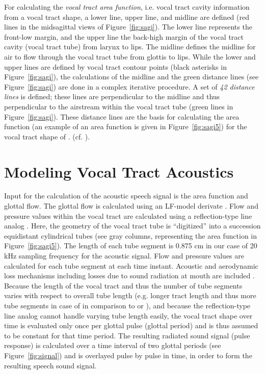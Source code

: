 \documentclass[conference]{IEEEtran}
\let\ipa\textipa
\begin{document}
For calculating the \textit{vocal tract area function}, i.e. vocal tract
cavity information from a vocal
tract shape, a lower line, upper line, and midline are defined
(red lines in the midsagittal views of Figure~\ref{fig:sagi}).
The lower line represents the front-low margin,
and the upper line the back-high margin of
the vocal tract cavity (vocal tract tube) from larynx to lips.
The midline defines the midline for air to flow through
the vocal tract tube from glottis to lips.
While the lower and upper lines are defined by vocal
tract contour points (black asterisks in Figure~\ref{fig:sagi}),
the calculations of the midline and the green distance lines
(see Figure~\ref{fig:sagi}) are done in a complex iterative procedure.
A set of \textit{42 distance lines} is defined;
these lines are perpendicular to the midline and thus perpendicular to the
airstream within the vocal tract tube (green lines in
Figure~\ref{fig:sagi}). These distance lines are the basis for
calculating the area function (an example of an area function is
given in Figure~\ref{fig:sagi5}) for the vocal tract shape of \ipa{[A]}. (cf.
\cite{perrier1992}).

\section{Modeling Vocal Tract Acoustics}

Input for the calculation of the acoustic speech signal is the area
function and glottal flow. The glottal flow is calculated using an
LF-model derivate \cite{veldhuis1998}. Flow and pressure values within
the vocal tract are calculated using a reflection-type line analog
\cite{liljencrants1985}. Here, the geometry of the vocal tract tube is
``digitized'' into a succession equidistant cylindrical tubes (see
gray columns, representing the area function in
Figure~\ref{fig:sagi5}). The length of each tube segment is 0.875 cm
in our case of 20 kHz sampling frequency for the acoustic signal. Flow
and pressure values are calculated for each tube segment at each time
instant. Acoustic and aerodynamic loss mechanisms including losses due
to sound radiation at mouth are included \cite{liljencrants1985}.
Because the length of the vocal tract and thus the number of tube
segments varies with respect to overall tube length (e.g. longer tract
length and thus more tube segments in case of \ipa{[u]} in comparison to \ipa{[i]}
or \ipa{[A]}), and because the reflection-type line analog cannot handle
varying tube length easily, the vocal tract shape over time is
evaluated only once per glottal pulse (glottal period) and is
thus assumed to be constant for that time period. The
resulting radiated sound signal (pulse response) is calculated over a
time interval of two glottal periods (see Figure~\ref{fig:signal}) and is
overlayed pulse by pulse in time, in order to form the resulting speech
sound signal.
\end{document}
